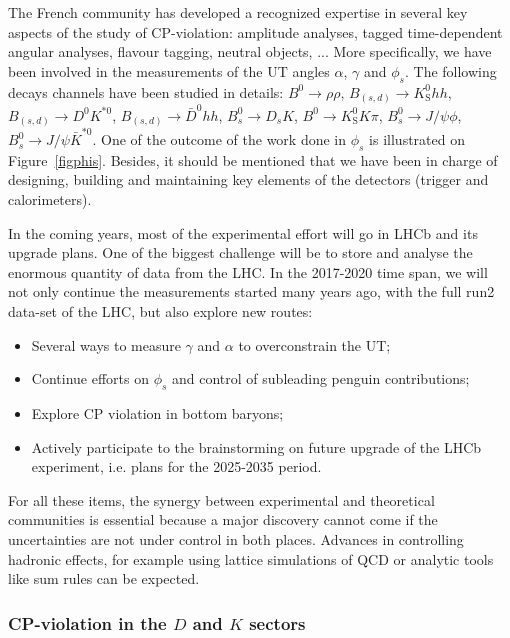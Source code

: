 The French community has developed a recognized expertise in several key
aspects of the study of CP-violation: amplitude analyses, tagged
time-dependent angular analyses, flavour tagging, neutral objects, ... More
specifically, we have been involved in the measurements of the UT angles
$\alpha$, $\gamma$ and $\phi_{s}$. The following decays channels have been
studied in details: $B^{0}\rightarrow\rho\rho$, $B_{(s,d)}\rightarrow
K_{\mathrm{S}}^{0}hh$, $B_{(s,d)}\rightarrow D^{0}K^{\ast0}$, $B_{(s,d)}%
\rightarrow\bar{D}^{0}hh$, $B_{s}^{0}\rightarrow D_{s}K$, $B^{0}\rightarrow
K_{\mathrm{S}}^{0}K\pi$, $B_{s}^{0}\rightarrow J/\psi\phi$, $B_{s}%
^{0}\rightarrow J/\psi\bar{K}^{\ast0}$. One of the outcome of the work done in
$\phi_{s}$ is illustrated on Figure~\ref{figphis}. Besides, it should be
mentioned that we have been in charge of designing, building and maintaining
key elements of the detectors (trigger and calorimeters).

In the coming years, most of the experimental effort will go in LHCb and its
upgrade plans. One of the biggest challenge will be to store and analyse the
enormous quantity of data from the LHC. In the 2017-2020 time span, we will
not only continue the measurements started many years ago, with the full run2
data-set of the LHC, but also explore new routes:

\begin{itemize}
\item Several ways to measure $\gamma$ and $\alpha$ to overconstrain the UT;

\item Continue efforts on $\phi_{s}$ and control of subleading penguin contributions;

\item Explore CP violation in bottom baryons;

\item Actively participate to the brainstorming on future upgrade of the LHCb
experiment, i.e. plans for the 2025-2035 period.
\end{itemize}

For all these items, the synergy between experimental and theoretical
communities is essential because a major discovery cannot come if the
uncertainties are not under control in both places. Advances in controlling
hadronic effects, for example using lattice simulations of QCD or analytic
tools like sum rules can be expected.

\subsubsection*{CP-violation in the $D$ and $K$ sectors}

